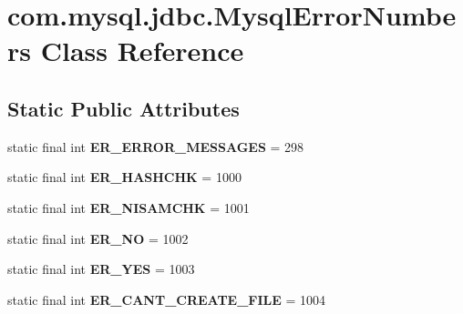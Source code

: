 \hypertarget{classcom_1_1mysql_1_1jdbc_1_1_mysql_error_numbers}{}\section{com.\+mysql.\+jdbc.\+Mysql\+Error\+Numbers Class Reference}
\label{classcom_1_1mysql_1_1jdbc_1_1_mysql_error_numbers}
\subsection*{Static Public Attributes}
\begin{DoxyCompactItemize}
\item 
\mbox{\label{classcom_1_1mysql_1_1jdbc_1_1_mysql_error_numbers_abd222acfa032eeb49fb9368ae1cd6778}} 
static final int {\bfseries E\+R\+\_\+\+E\+R\+R\+O\+R\+\_\+\+M\+E\+S\+S\+A\+G\+ES} = 298
\item 
\mbox{\label{classcom_1_1mysql_1_1jdbc_1_1_mysql_error_numbers_afff8b0d89a4afe163ddc5f2e22acad77}} 
static final int {\bfseries E\+R\+\_\+\+H\+A\+S\+H\+C\+HK} = 1000
\item 
\mbox{\label{classcom_1_1mysql_1_1jdbc_1_1_mysql_error_numbers_a310e9dfd0cd159f0a7a4468f24fc92c5}} 
static final int {\bfseries E\+R\+\_\+\+N\+I\+S\+A\+M\+C\+HK} = 1001
\item 
\mbox{\label{classcom_1_1mysql_1_1jdbc_1_1_mysql_error_numbers_a057d776917d5c1bef4bb78add6b5d86a}} 
static final int {\bfseries E\+R\+\_\+\+NO} = 1002
\item 
\mbox{\label{classcom_1_1mysql_1_1jdbc_1_1_mysql_error_numbers_aee335e604ada6c88ac41526122f6ec0e}} 
static final int {\bfseries E\+R\+\_\+\+Y\+ES} = 1003
\item 
\mbox{\label{classcom_1_1mysql_1_1jdbc_1_1_mysql_error_numbers_aca53129e2e07969b0104b70b6129febf}} 
static final int {\bfseries E\+R\+\_\+\+C\+A\+N\+T\+\_\+\+C\+R\+E\+A\+T\+E\+\_\+\+F\+I\+LE} = 1004

\end{DoxyCompactItemize}
